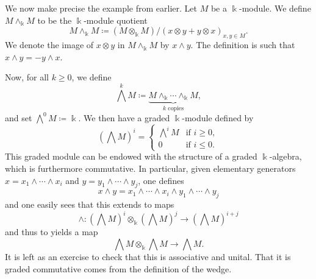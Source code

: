 \begin{example}
	We now make precise the example from earlier. Let \(M\) be a \(\Bbbk\)-module. We define \(M\wedge_\Bbbk M\) to be the
	\(\Bbbk\)-module quotient
	\[ M\wedge_\Bbbk M \coloneq (M\otimes_\Bbbk M)/(x\otimes y + y\otimes x)_{x,y\in M}. \]
	We denote the image of \(x\otimes y\) in \(M\wedge_\Bbbk M\) by \(x\wedge y\). The definition is such that \(x\wedge y = -y\wedge x\).

	Now, for all \(k\geq 0\), we define
	\[ \bigwedge^kM \coloneq \underbrace{M\wedge_\Bbbk \cdots \wedge_\Bbbk M}_{k\text{ copies}}, \]
	and set \(\bigwedge^0M \coloneq \Bbbk\). We then have a graded \(\Bbbk\)-module defined by
	\[ \left(\bigwedge M\right)^i = \begin{cases}
		\bigwedge^i M & \text{if }i\geq 0, \\
		0 & \text{if }i \leq 0.
	\end{cases} \]
	This graded module can be endowed with the structure of a graded \(\Bbbk\)-algebra, which is furthermore commutative. In particular, given
	elementary generators \(x = x_1\wedge \cdots \wedge x_i\) and \(y = y_1\wedge \cdots \wedge y_j\), one defines
	\[ x\wedge y = x_1\wedge \cdots \wedge x_i \wedge y_1 \wedge \cdots \wedge y_j \]
	and one easily sees that this extends to maps
	\[ \wedge\!: \left(\bigwedge M\right)^i \otimes_\Bbbk \left(\bigwedge M\right)^j \to \left(\bigwedge M\right)^{i+j} \]
	and thus to yields a map
	\[ \bigwedge M \otimes_\Bbbk \bigwedge M \to \bigwedge M. \]
	It is left as an exercise to check that this is associative and unital. That it is graded commutative comes from the definition of the wedge.
\end{example}

